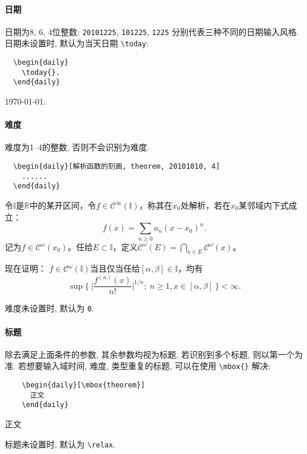\documentclass{SYSUDaily}
\begin{document}
\paragraph{日期}
日期为8, 6, 4位整数: \verb|20101225|, \verb|101225|, \verb|1225| 分别代表三种不同的日期输入风格.
日期未设置时, 默认为当天日期 \verb|\today|:

\begin{multicols}{2}
	\begin{lstlisting}
  \begin{daily}
    \today{}.
  \end{daily}
  \end{lstlisting}
	\small
	\begin{daily}
		\today{}.
	\end{daily}
\end{multicols}
\paragraph{难度}
难度为1--4的整数, 否则不会识别为难度.
\begin{lstlisting}
  \begin{daily}[解析函数的刻画, theorem, 20101010, 4]
    ......
  \end{daily}
\end{lstlisting}
\begin{daily}
	令$\mathbb I$是$\mathbb R$中的某开区间，令$f\in \mathscr{C}^\infty(\mathbb  I)$，称其在$x_0$处解析，若在$x_0$某邻域内下式成立：
	$$
	f(x) = \sum_{n\geqslant0} a_n(x-x_0)^n.
	$$
	记为$f\in \mathscr{C}^\omega(x_0)$。任给$E\subset \mathbb I$，定义$\mathscr{C}^\omega(E)=\bigcap_{x\in E}\mathscr{C}^\omega(x)$。

	现在证明：
	$f\in \mathscr{C}^\omega(\mathbb I)$当且仅当任给$[\alpha,\beta]\in \mathbb I$，均有
	\[
			\sup\biggl\{~\biggl| \frac{f^{(n)}(x)}{n!} \biggr|^{1/n}\!;~n\geqslant 1, x\in [\alpha,\beta] ~\biggr\}   <\infty.
	\]
\end{daily}
难度未设置时, 默认为 \verb|0|.
\paragraph{标题}
除去满足上面条件的参数, 其余参数均视为标题, 若识别到多个标题, 则以第一个为准.
若想要输入域时间, 难度, 类型重复的标题, 可以在使用 \verb|\mbox{}| 解决:
\begin{multicols}{2}
	\begin{lstlisting}
    \begin{daily}[\mbox{theorem}]
      正文
    \end{daily}
  \end{lstlisting}
	\small
	\begin{daily}
		正文
	\end{daily}
\end{multicols}
标题未设置时, 默认为 \verb|\relax|.
\end{document}
